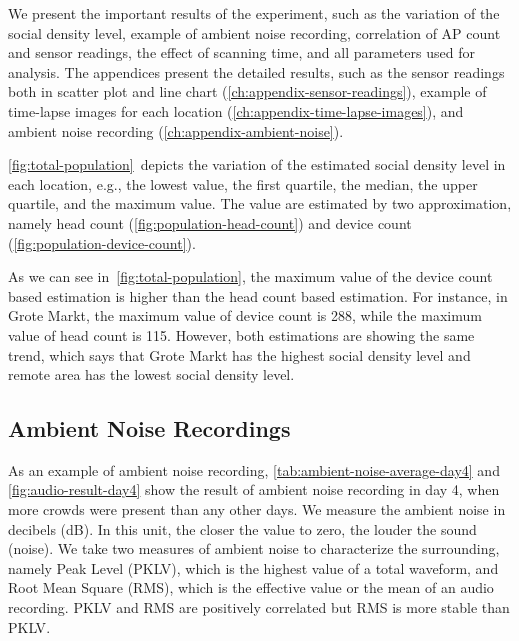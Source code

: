 We present the important results of the experiment, such as the variation of the social density level, example of ambient noise recording, correlation of \ac{AP} count and sensor readings, the effect of scanning time, and all parameters used for analysis. The appendices present the detailed results, such as the sensor readings both in scatter plot and line chart (\autoref{ch:appendix-sensor-readings}), example of time-lapse images for each location (\autoref{ch:appendix-time-lapse-images}), and ambient noise recording (\autoref{ch:appendix-ambient-noise}).

\autoref{fig:total-population}~depicts the variation of the estimated social density level in each location, e.g., the lowest value, the first quartile, the median, the upper quartile, and the maximum value. The value are estimated by two approximation, namely head count (\ref{fig:population-head-count}) and device count (\ref{fig:population-device-count}).

As we can see in~\autoref{fig:total-population}, the maximum value of the device count based estimation is higher than the head count based estimation. For instance, in Grote Markt, the maximum value of device count is 288, while the maximum value of head count is 115. However, both estimations are showing the same trend, which says that Grote Markt has the highest social density level and remote area has the lowest social density level.













	\subsection{Ambient Noise Recordings} %
	\label{sub:ambient_noise_recordings}
	As an example of ambient noise recording, \autoref{tab:ambient-noise-average-day4} and \autoref{fig:audio-result-day4} show the result of ambient noise recording in day 4, when more crowds were present than any other days. We measure the ambient noise in decibels (dB). In this unit, the closer the value to zero, the louder the sound (noise). We take two measures of ambient noise to characterize the surrounding, namely Peak Level (\ac{PKLV}), which is the highest value of a total waveform, and Root Mean Square (\ac{RMS}), which is the effective value or the mean of an audio recording. \ac{PKLV} and \ac{RMS} are positively correlated but \ac{RMS} is more stable than \ac{PKLV}.

